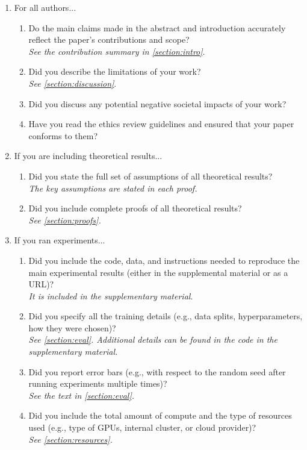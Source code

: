 \begin{enumerate}

\item For all authors...
\begin{enumerate}
\item Do the main claims made in the abstract and introduction accurately reflect the paper's contributions and scope?
  \answerYes{} \\
  \textit{See the contribution summary in \cref{section:intro}}.
\item Did you describe the limitations of your work?
  \answerYes{} \\
  \textit{See \cref{section:discussion}}.
\item Did you discuss any potential negative societal impacts of your work?
  \answerNo{}
\item Have you read the ethics review guidelines and ensured that your paper conforms to them?
  \answerYes{}
\end{enumerate}

\item If you are including theoretical results...
  \begin{enumerate}
  \item Did you state the full set of assumptions of all theoretical results?
    \answerYes{} \\
    \textit{The key assumptions are stated in each proof.}
  \item Did you include complete proofs of all theoretical results?
    \answerYes{} \\
    \textit{See \cref{section:proofs}.}
\end{enumerate}

\item If you ran experiments...
\begin{enumerate}
\item Did you include the code, data, and instructions needed to reproduce the main experimental results (either in the supplemental material or as a URL)?
  \answerYes{} \\
  \textit{It is included in the supplementary material}.
\item Did you specify all the training details (e.g., data splits, hyperparameters, how they were chosen)?
  \answerYes{} \\
  \textit{See \cref{section:eval}. Additional details can be found in the code in the supplementary material.}
\item Did you report error bars (e.g., with respect to the random seed after running experiments multiple times)?
  \answerYes{} \\
  \textit{See the text in \cref{section:eval}.}
\item Did you include the total amount of compute and the type of resources used (e.g., type of GPUs, internal cluster, or cloud provider)?
  \answerYes{} \\
  \textit{See \cref{section:resources}.}
\end{enumerate}



\end{enumerate}
